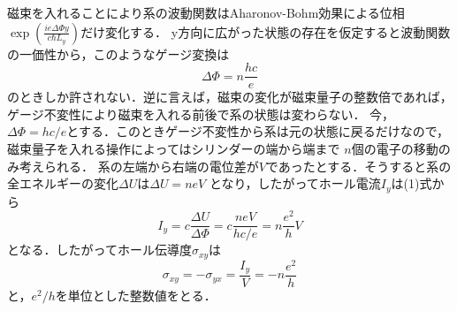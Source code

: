 \documentclass[]{jsarticle}
\begin{document}
\begin{comment}
次に具体的にハミルトニアンを見てみる．ランダウゲージ$\bm{A} = (0,B_0x,0)$を採用すれば，磁束を入れる前の系のハミルトニアンは
\begin{equation}
    H = \frac{1}{2m}\left\{p_x^2 + \left(p_y - \frac{eB_0x}{c} \right)^2 \right \},
\end{equation}
である．ハミルトニアンが$y$を含まないため$[H,p_y] = 0$であり，$p_y$の固有値を$\hbar k_y$とすれば
\begin{equation}
    H = \frac{1}{2m} p_x^2  + \frac{m}{2} \omega^2 \left(x - \frac{c \hbar k_y}{eB_0} \right)^2,
\end{equation}
$\omega = eB_0/mc$は振動数,$x_0 = c\hbar k_y /eB_0$は振動中心である．これは調和振動子のハミルトニアンであり，したがって系のエネルギー準位は
\begin{equation}
    E_n = \hbar \omega \left(n + \frac{1}{2} \right),
\end{equation}
と離散的に量子化されたランダウ準位となる．


磁束が入った後もゲージ不変性によりハミルトニアン自体は不変であり，エネルギー分散も変化しない．しかし，元の系の波動関数を$e^{ik_y y}\phi_n$とすれば，
磁束を入れることにより波動関数は$e^{ik_y y} \phi_n \to e^{i(k_y + eA_y /\hbar c)y} \phi_n $ と変化するため，磁束が入ると振動中心が
$\displaystyle x_0 \to x_0 + \frac{A_y}{B_0} $だけズレる．すなわち，系の電子が$x$方向に移動する．
\end{comment}
磁束を入れることにより系の波動関数はAharonov-Bohm効果による位相$\displaystyle \exp{ \left(\frac{ie \Delta \Phi y}{c\hbar L_y} \right)}$だけ変化する．
y方向に広がった状態の存在を仮定すると波動関数の一価性から，このようなゲージ変換は
\begin{equation}
    \Delta \Phi = n \frac{hc}{e}
\end{equation}
のときしか許されない．逆に言えば，磁束の変化が磁束量子の整数倍であれば，ゲージ不変性により磁束を入れる前後で系の状態は変わらない．
今，$\Delta \Phi = hc/e$とする．このときゲージ不変性から系は元の状態に戻るだけなので，磁束量子を入れる操作によってはシリンダーの端から端まで
$n$個の電子の移動のみ考えられる．
系の左端から右端の電位差が$V$であったとする．そうすると系の全エネルギーの変化$\Delta U$は$\Delta U = neV$
となり，したがってホール電流$I_y$は(1)式から
\begin{equation}
    I_y = c\frac{\Delta U}{\Delta \Phi} = c\frac{neV}{hc/e} = n \frac{e^2}{h} V
\end{equation}
となる．したがってホール伝導度$\sigma_{xy}$は
\begin{equation}
    \sigma_{xy} = -\sigma_{yx} = \frac{I_y}{V} = -n\frac{e^2}{h}
\end{equation}
と，$e^2/h$を単位とした整数値をとる．

\end{document}
